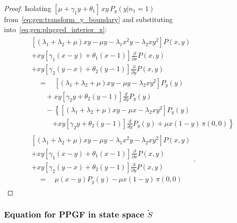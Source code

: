 \begin{proof}
    Isolating $[\mu+\gamma_1 y+\theta_1]\,xy\,P_y(y|n_1=1)$ from~\eqref{eq:gen:transform_y_boundary} and substituting into~\eqref{eq:gen:plugged_interior_x}:
    \begin{align}
        \begin{split}
            & \left[ (\lambda_1+\lambda_2+\mu)xy - \mu y - \lambda_1 x^2 y - \lambda_2 x y^2 \right] P(x,y) \\
            & + xy \left[ \gamma_1(x-y) + \theta_1(x-1) \right] \frac{\partial}{\partial x} P(x,y) \\
            & + xy \left[ \gamma_2(y-x) + \theta_2(y-1) \right] \frac{\partial}{\partial y} P(x,y) \\
            & \quad = \quad \left[ (\lambda_1 + \lambda_2 + \mu)xy - \mu y - \lambda_2 x y^2 \right] P_y(y) \\
            & \quad \quad + xy \left[ \gamma_2 y + \theta_2(y-1) \right] \frac{d}{dy} P_y(y) \\
            & \quad \quad - \left\{ \left[ (\lambda_1 + \lambda_2 + \mu)xy - \mu x - \lambda_2 x y^2 \right] P_y(y) \right. \\
            & \quad \quad \quad \left. + xy \left[ \gamma_2 y + \theta_2(y-1) \right] \frac{d}{dy} P_y(y) + \mu x(1-y) \, \pi(0,0) \right\}
        \end{split} \nonumber \\
        \begin{split}
            & \left[ (\lambda_1+\lambda_2+\mu)xy - \mu y - \lambda_1 x^2 y - \lambda_2 x y^2 \right] P(x,y) \\
            & + xy \left[ \gamma_1(x-y) + \theta_1(x-1) \right] \frac{\partial}{\partial x} P(x,y) \\
            & + xy \left[ \gamma_2(y-x) + \theta_2(y-1) \right] \frac{\partial}{\partial y} P(x,y) \\
            & \quad = \quad \mu(x-y) P_y(y) - \mu x(1-y) \, \pi(0,0)
        \end{split}.
    \end{align}
\end{proof}


\subsubsection{Equation for PPGF in state space \texorpdfstring{$\widetilde{S}$}{S~}}

